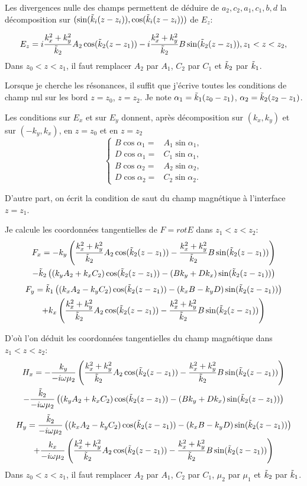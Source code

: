 \documentclass{amsart}
\begin{document}
Les divergences nulle des champs permettent de déduire de \(a_2,c_2,a_1,c_1,b,d\) la décomposition sur \((\sin(\tilde{k}_i(z-z_i)),\cos(\tilde{k}_i(z-z_i)))\) de \(E_z\):

\[
E_z=i\dfrac{k_x^2+k_y^2}{\tilde{k}_2}A_2\cos(\tilde{k}_2(z-z_1))-i\dfrac{k_x^2+k_y^2}{\tilde{k}_2}B\sin(\tilde{k}_2(z-z_1)), z_1<z<z_2,
\]
Dans \(z_0<z<z_1\), il faut remplacer \(A_2\) par \(A_1\), \(C_2\) par \(C_1\) et \(\tilde{k}_2\) par \(\tilde{k}_1\).

Lorsque je cherche les résonances, il suffit que j'écrive toutes les conditions de champ nul sur les bord \(z=z_0\), \(z=z_2\).
Je note \(\alpha_1=\tilde{k}_1(z_0-z_1)\), \(\alpha_2=\tilde{k}_2(z_2-z_1)\).

Les conditions sur \(E_x\) et sur \(E_y\) donnent, après décomposition sur \((k_x,k_y)\) et sur \((-k_y,k_x)\), en \(z=z_0\) et en \(z=z_2\)
\[
\left\{
\begin{aligned}
B\cos \alpha_1={}& A_1\sin \alpha_1,
\\
D\cos \alpha_1={}& C_1\sin \alpha_1,
\\
B\cos \alpha_2={}& A_2\sin \alpha_2,
\\
D\cos \alpha_2={}& C_2\sin \alpha_2.
\end{aligned}
\right.
\]

D'autre part, on écrit la condition de saut du champ magnétique à l'interface \(z=z_1\).

Je calcule les coordonnées tangentielles de \(F = rot E\) dans \(z_1<z<z_2\):
\begin{multline*}
F_x = -k_y\left(\dfrac{k_x^2+k_y^2}{\tilde{k}_2}A_2\cos(\tilde{k}_2(z-z_1))-\dfrac{k_x^2+k_y^2}{\tilde{k}_2}B\sin(\tilde{k}_2(z-z_1))\right)
\\
-\tilde{k}_2\left((k_yA_2+k_xC_2)\cos(\tilde{k}_2(z-z_1))-(Bk_y+Dk_x)\sin(\tilde{k}_2(z-z_1))\right)
\end{multline*}
\begin{multline*}
F_y = \tilde{k}_1\left((k_xA_2-k_yC_2)\cos(\tilde{k}_2(z-z_1))-(k_xB-k_yD)\sin(\tilde{k}_2(z-z_1))\right)
\\
+k_x\left(\dfrac{k_x^2+k_y^2}{\tilde{k}_2}A_2\cos(\tilde{k}_2(z-z_1))-\dfrac{k_x^2+k_y^2}{\tilde{k}_2}B\sin(\tilde{k}_2(z-z_1))\right)
\end{multline*}

D'où l'on déduit les coordonnées tangentielles du champ magnétique dans \(z_1<z<z_2\):
\begin{multline*}
H_x = -\dfrac{k_y}{-i\omega\mu_2}\left(\dfrac{k_x^2+k_y^2}{\tilde{k}_2}A_2\cos(\tilde{k}_2(z-z_1))-\dfrac{k_x^2+k_y^2}{\tilde{k}_2}B\sin(\tilde{k}_2(z-z_1))\right)
\\
-\dfrac{\tilde{k}_2}{-i\omega\mu_2}\left((k_yA_2+k_xC_2)\cos(\tilde{k}_2(z-z_1))-(Bk_y+Dk_x)\sin(\tilde{k}_2(z-z_1))\right)
\end{multline*}
\begin{multline*}
H_y = \dfrac{\tilde{k}_2}{-i\omega\mu_2}\left((k_xA_2-k_yC_2)\cos(\tilde{k}_2(z-z_1))-(k_xB-k_yD)\sin(\tilde{k}_2(z-z_1))\right)
\\
+\dfrac{k_x}{-i\omega\mu_2}\left(\dfrac{k_x^2+k_y^2}{\tilde{k}_2}A_2\cos(\tilde{k}_2(z-z_1))-\dfrac{k_x^2+k_y^2}{\tilde{k}_2}B\sin(\tilde{k}_2(z-z_1))\right)
\end{multline*}
Dans \(z_0<z<z_1\), il faut remplacer \(A_2\) par \(A_1\), \(C_2\) par \(C_1\), \(\mu_2\) par \(\mu_1\) et \(\tilde{k}_2\) par \(\tilde{k}_1\).
\end{document}
